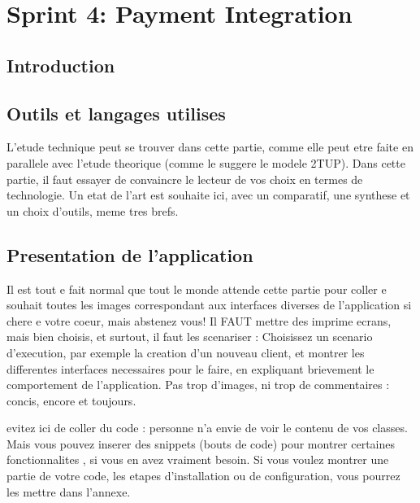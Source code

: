 
\setcounter{chapter}{5}
\chapter{Sprint 4: Payment Integration}
\minitoc %
\graphicspath{{Chapter6/figures/}}

\pagestyle{fancy}
\fancyhf{}
\fancyhead[R]{\bfseries\rightmark}
\fancyfoot[R]{\thepage}
\renewcommand{\headrulewidth}{0.5pt}
\renewcommand{\footrulewidth}{0pt}
\renewcommand{\chaptermark}[1]{\markboth{\MakeUppercase{\chaptername~\thechapter. #1 }}{}}
\renewcommand{\sectionmark}[1]{\markright{\thechapter.\thesection~ #1}}

\begin{spacing}{1.2}

\section*{Introduction}

\section{Outils et langages utilises}
L'etude technique peut se trouver dans cette partie, comme elle peut etre faite en
parallele avec l'etude theorique (comme le suggere le modele 2TUP).
Dans cette partie, il faut essayer de convaincre le lecteur de vos choix en termes de
technologie. Un etat de l'art est souhaite ici, avec un comparatif, une synthese et un choix 
d'outils, meme tres brefs.
\section{Presentation de l'application}
Il est tout e fait normal que tout le monde attende cette partie pour coller e souhait toutes les images
correspondant aux interfaces diverses de l'application si chere e votre coeur, mais
abstenez vous! Il FAUT mettre des imprime ecrans, mais bien choisis, et surtout, il faut les scenariser : Choisissez un scenario d'execution, par exemple la creation d'un 
nouveau client, et montrer les differentes interfaces necessaires pour le faire, en
expliquant brievement le comportement de l'application. Pas trop d'images, ni trop de
commentaires : concis, encore et toujours.

evitez ici de coller du code : personne n'a envie de voir le contenu de vos classes.
Mais  vous  pouvez inserer des snippets (bouts de code) pour montrer certaines
fonctionnalites \cite{ELKALMEL2019}\cite{Latex}, si vous en avez vraiment besoin. Si vous voulez montrer une partie de votre code, les etapes d'installation ou de configuration, vous pourrez les mettre dans l'annexe.

\end{spacing}
